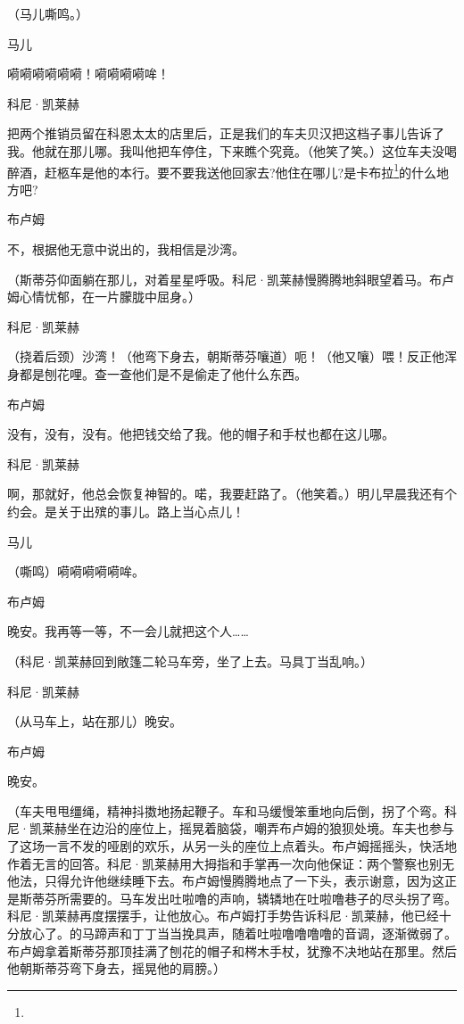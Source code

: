 \par （马儿嘶鸣。）
\par 马儿
\par 嗬嗬嗬嗬嗬嗬！嗬嗬嗬嗬哞！
\par 科尼·凯莱赫
\par 把两个推销员留在科恩太太的店里后，正是我们的车夫贝汉把这档子事儿告诉了我。他就在那儿哪。我叫他把车停住，下来瞧个究竟。（他笑了笑。）这位车夫没喝醉酒，赶柩车是他的本行。要不要我送他回家去?他住在哪儿?是卡布拉\footnote{}的什么地方吧?
\par 布卢姆
\par 不，根据他无意中说出的，我相信是沙湾。
\par （斯蒂芬仰面躺在那儿，对着星星呼吸。科尼·凯莱赫慢腾腾地斜眼望着马。布卢姆心情忧郁，在一片朦胧中屈身。）
\par 科尼·凯莱赫
\par （挠着后颈）沙湾！（他弯下身去，朝斯蒂芬嚷道）呃！（他又嚷）喂！反正他浑身都是刨花哩。查一查他们是不是偷走了他什么东西。
\par 布卢姆
\par 没有，没有，没有。他把钱交给了我。他的帽子和手杖也都在这儿哪。
\par 科尼·凯莱赫
\par 啊，那就好，他总会恢复神智的。喏，我要赶路了。（他笑着。）明儿早晨我还有个约会。是关于出殡的事儿。路上当心点儿！
\par 马儿
\par （嘶鸣）嗬嗬嗬嗬嗬哞。
\par 布卢姆
\par 晚安。我再等一等，不一会儿就把这个人……
\par （科尼·凯莱赫回到敞篷二轮马车旁，坐了上去。马具丁当乱响。）
\par 科尼·凯莱赫
\par （从马车上，站在那儿）晚安。
\par 布卢姆
\par 晚安。
\par （车夫甩甩缰绳，精神抖擞地扬起鞭子。车和马缓慢笨重地向后倒，拐了个弯。科尼·凯莱赫坐在边沿的座位上，摇晃着脑袋，嘲弄布卢姆的狼狈处境。车夫也参与了这场一言不发的哑剧的欢乐，从另一头的座位上点着头。布卢姆摇摇头，快活地作着无言的回答。科尼·凯莱赫用大拇指和手掌再一次向他保证：两个警察也别无他法，只得允许他继续睡下去。布卢姆慢腾腾地点了一下头，表示谢意，因为这正是斯蒂芬所需要的。马车发出吐啦噜的声响，辚辚地在吐啦噜巷子的尽头拐了弯。科尼·凯莱赫再度摆摆手，让他放心。布卢姆打手势告诉科尼·凯莱赫，他已经十分放心了。的马蹄声和丁丁当当挽具声，随着吐啦噜噜噜噜的音调，逐渐微弱了。布卢姆拿着斯蒂芬那顶挂满了刨花的帽子和梣木手杖，犹豫不决地站在那里。然后他朝斯蒂芬弯下身去，摇晃他的肩膀。）

